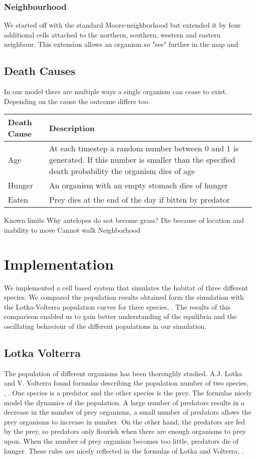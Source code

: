\documentclass[11pt]{article}
\begin{document}
\subsubsection{Neighbourhood}
We started off with the standard Moore-neighborhood but extended it by four additional cells attached to the northern, southern, western and eastern neighbour. This extension allows an organism so "see" further in the map and 


\subsection{Death Causes}
In our model there are multiple ways a single organism can cease to exist. Depending on the cause the outcome differs too. 
\\
\begin{tabular}{l|p{11cm}}\label{tab:deathCauses}
Death Cause & Description \\ 
\hline 
\hline 
Age & At each timestep a random number between 0 and 1 is generated. If this number is smaller than the specified death probability the organism dies of age\\ 
\hline 
Hunger & An organism with an empty stomach dies of hunger \\ 
\hline 
Eaten & Prey dies at the end of the day if bitten by predator \\  
\end{tabular} 


Known limits
Why antelopes do not become grass?
Die because of location and inability to move
Cannot walk
Neighborhood

\section{Implementation}
We implemented a cell based system that simulates the habitat of three different species.
We compared the population results obtained form the simulation with the Lotka-Volterra population curves for three species, \cite{lotkaVolterraThreeSpecies}. The results of this comparison enabled us to gain better understanding of the equilibria and the oscillating behaviour of the different populations in our simulation.

\subsection{Lotka Volterra}
The population of different organisms has been thoroughly studied. A.J. Lotka and V. Volterra found formulas describing the population number of two species, \cite{lotka}, \cite{volterra}. One species is a predator and the other species is the prey. The formulas nicely model the dynamics of the population. A large number of predators results in a decrease in the number of prey organisms, a small number of predators allows the prey organisms to increase in number. On the other hand, the predators are fed by the prey, so predators only flourish when there are enough organisms to prey upon. When the number of prey organism becomes too little, predators die of hunger. These rules are nicely reflected in the formulas of Lotka and Volterra, \cite{lotkaVolterra}.\\
\end{document}
